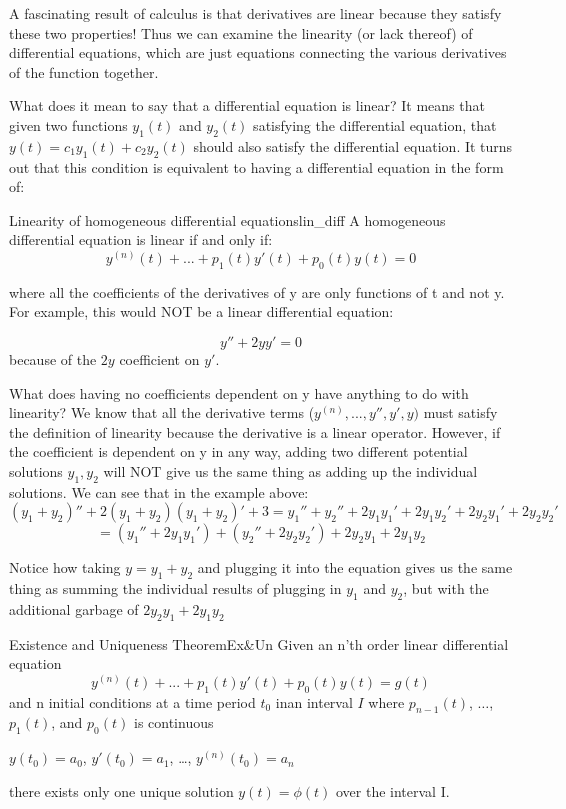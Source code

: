 \documentclass{report}
\begin{document}
A fascinating result of calculus is that derivatives are linear because they satisfy these two properties! Thus we can examine the linearity (or lack thereof) of differential equations, which are just equations connecting the various derivatives of the function together.

What does it mean to say that a differential equation is linear? It means that given two functions $y_1(t)$ and $y_2(t)$ satisfying the differential equation, that $y(t) = c_1y_1(t) + c_2y_2(t)$ should also satisfy the differential equation. It turns out that this condition is equivalent to having a differential equation in the form of:

\begin{mytheo}{Linearity of homogeneous differential equations}{lin_diff}
    A homogeneous differential equation is linear if and only if:
    $$y^{(n)}(t) + ... + p_1(t)y'(t) + p_0(t)y(t) = 0$$
\end{mytheo}


where all the coefficients of the derivatives of y are only functions of t and not y. For example, this would NOT be a linear differential equation:

$$y'' + 2yy' = 0$$
because of the $2y$ coefficient on $y'$.

What does having no coefficients dependent on y have anything to do with linearity? We know that all the derivative terms ($y^(n), ..., y'', y', y)$ must satisfy the definition of linearity because the derivative is a linear operator. However, if the coefficient is dependent on y in any way, adding two different potential solutions $y_1, y_2$ will NOT give us the same thing as adding up the individual solutions. We can see that in the example above:
$$(y_1+y_2)''+2(y_1+y_2)(y_1+y_2)'+3 = y_1'' + y_2'' + 2y_1y_1'+2y_1y_2' +2y_2y_1'+2y_2y_2'$$
$$=(y_1''+2y_1y_1')+ (y_2''+2y_2y_2')+2y_2y_1+2y_1y_2$$

Notice how taking $y = y_1+y_2$ and plugging it into the equation gives us the same thing as summing the individual results of plugging in $y_1$ and $y_2$, but with the additional garbage of $2y_2y_1+2y_1y_2$

\begin{mytheo}{Existence and Uniqueness Theorem}{Ex&Un}
    Given an n'th order linear differential equation
    $$y^{(n)}(t) + ... + p_1(t)y'(t) + p_0(t)y(t) = g(t)$$
    and n initial conditions at a time period $t_0$ inan interval $I$ where $p_{n-1}(t)$, $\dots$, $p_1(t)$, and $p_0(t)$ is continuous
    
    $y(t_0) = a_0$, $y'(t_0) = a_1$, \dots, $y^{(n)}(t_0) = a_n$
    
    there exists only one unique solution $y(t) = \phi(t)$ over the interval I.
    
\end{mytheo}
\end{document}

